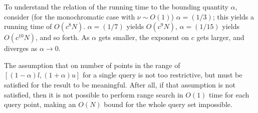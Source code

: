 





To understand the relation of the running time to the bounding quantity
$\alpha$, consider (for the monochromatic case with $\nu \sim O(1)$) $\alpha =
(1 / 3)$; this yields a running time of $O(c^8 N)$.  $\alpha = (1 / 7)$ yields
$O(c^9 N)$, $\alpha = (1 / 15)$ yields $O(c^{10} N)$, and so forth.  As $\alpha$
gets smaller, the exponent on $c$ gets larger, and diverges as $\alpha \to 0$.

The assumption that on number of points in the range of $[(1 - \alpha)l, (1 +
\alpha)u]$ for a single query is not too restrictive, but must be satisfied for
the result to be meaningful.  After all, if that assumption is not satisfied,
then it is not possible to perform range search in $O(1)$ time for each query
point, making an $O(N)$ bound for the whole query set impossible.

